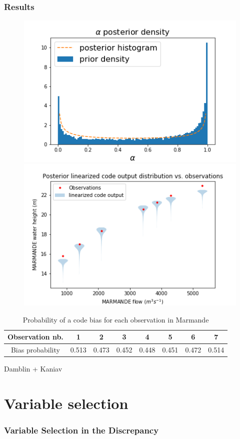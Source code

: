\documentclass[nopagenumber,9pt]{beamer}
\begin{document}
\begin{frame}
 \frametitle{Results}

 
 \begin{figure}
  \centering
  \includegraphics[scale=.3]{Marmande_Alpha_posterior_density.png}
  \includegraphics[scale=.3]{MARMANDE_posterior_vs_data.png}
 \end{figure}

 
 
 
 \begin{table}[h!]
\begin{tabular}{c|ccccccc}
Observation nb.		& 1		 & 2	  & 3	   & 4		& 5		 & 6	  & 7    \\ 
\hline
Bias probability &  0.513&  0.473&  0.452&  0.448&  0.451&  0.472&  0.514
\end{tabular}
\caption{\label{tab:nobias_p_Marmande} Probability of a code bias for each observation in Marmande}
\end{table}

\end{frame}




\begin{frame}
 Damblin + Kaniav
\end{frame}

\section{Variable selection}
\begin{frame}
 \frametitle{Variable Selection in the Discrepancy}
 
\end{frame}





\end{document}
